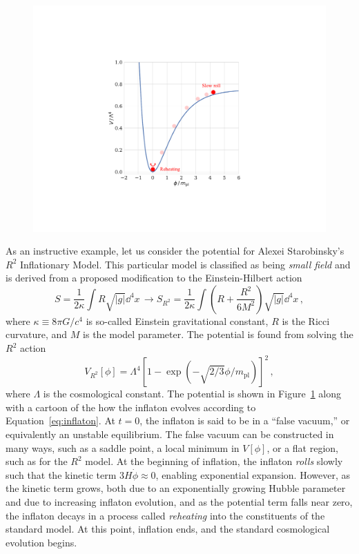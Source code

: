 \begin{figure}[!t]
    \centering
    \includegraphics[width=0.7\linewidth, trim=6cm 4cm 6cm 5cm, clip=True]{ScientificMotivation/Figures/inflation_potential.pdf}
    \caption[The $R^{2}$ inflationary potential, which serves as an instructive example of slow-roll inflation.]{}
    \label{fig:inflation_potential}
\end{figure}

As an instructive example, let us consider the potential for Alexei Starobinsky's $R^{2}$ Inflationary Model. This particular model is classified as being \textit{small field} and is derived from a proposed modification to the Einstein-Hilbert action
\begin{equation}
    S = \frac{1}{2 \kappa} \int R \sqrt{| g |} \dd^{4}x \, \rightarrow S_{R^{2}} = \frac{1}{2 \kappa} \int \left(R + \frac{R^{2}}{6 M^{2}} \right) \sqrt{| g |} \dd^{4}x \, ,
    \label{eq:R2_action}
\end{equation}
where $\kappa \equiv 8 \pi G / c^{4}$ is so-called Einstein gravitational constant, $R$ is the Ricci curvature, and $M$ is the model parameter. The potential is found from solving the $R^{2}$ action
\begin{equation}
    V_{R^{2}}[\phi] = \Lambda^{4} \left[ 1 - \exp \left( - \sqrt{2 / 3} \phi / m_{\mathrm{pl}} \right) \right]^{2} \, ,
    \label{eq:starobinsky_potential}
\end{equation}
where $\Lambda$ is the cosmological constant.
The potential is shown in Figure~\ref{fig:inflation_potential} along with a cartoon of the how the inflaton evolves according to Equation~\ref{eq:inflaton}. At $t = 0$, the inflaton is said to be in a ``false vacuum,'' or equivalently an unstable equilibrium. The false vacuum can be constructed in many ways, such as a saddle point, a local minimum in $V[\phi]$, or a flat region, such as for the $R^{2}$ model. At the beginning of inflation, the inflaton \textit{rolls} slowly such that the kinetic term $3 H \dot{\phi} \approx 0$, enabling exponential expansion. However, as the kinetic term grows, both due to an exponentially growing Hubble parameter and due to increasing inflaton evolution, and as the potential term falls near zero, the inflaton decays in a process called \textit{reheating} into the constituents of the standard model. At this point, inflation ends, and the standard cosmological evolution begins.


